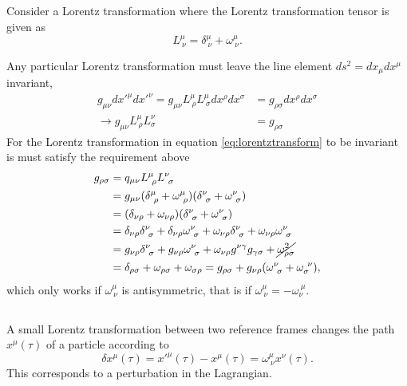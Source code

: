 \documentclass[11pt]{amsart}
\begin{document}
\subsection{}
Consider a Lorentz transformation where the Lorentz transformation tensor is given as
\begin{equation}
\label{eq:lorentztransform}
L^\mu_{\ \nu} = \delta^{\mu}_{\ \nu} + \omega^{\mu}_{\ \nu}.
\end{equation}

Any particular Lorentz transformation must leave the line element $ds^2 = dx_{\mu}dx^{\mu}$ invariant,
\begin{align*}
g_{\mu\nu}dx'^{\mu}dx'^{\nu} = g_{\mu\nu} L^\mu_{\ \rho} L^\mu_{\ \sigma}dx^\rho dx^\sigma 
											&= g_{\rho\sigma}dx^\rho dx^\sigma \\
\rightarrow g_{\mu\nu}L^{\mu}_{\ \rho}L^{\nu}_{\sigma}	&= g_{\rho\sigma}
\end{align*}
For the Lorentz transformation in equation \ref{eq:lorentztransform} to be invariant is must satisfy the requirement above
\begin{align*}
g_{\rho\sigma}  &= q_{\mu\nu}L^{\mu}_{\ \rho}L^{\nu}_{\ \sigma} \\
			&= g_{\mu\nu}(\delta^{\mu}_{\ \rho} + \omega^{\mu}_{\ \rho})(\delta^{\nu}_{\ \sigma} + \omega^{\nu}_{\ \sigma}) \\
			&= (\delta_{\nu\rho} + \omega_{\nu\rho})(\delta^{\nu}_{\ \sigma} + \omega^{\nu}_{\ \sigma}) \\
			&= \delta_{\nu\rho}\delta^{\nu}_{\ \sigma} + \delta_{\nu\rho}\omega^{\nu}_{\ \sigma} + \omega_{\nu\rho}\delta^{\nu}_{\ \sigma} + \omega_{\nu\rho}\omega^{\nu}_{\ \sigma} \\
			&= g_{\nu\rho}\delta^{\nu}_{\ \sigma} + g_{\nu\rho}\omega^{\nu}_{\ \sigma} + \omega_{\nu\rho}g^{\nu\gamma} g_{\gamma\sigma} + \cancel{\omega^2_{\rho\sigma}} \\
			& = \delta_{\rho\sigma} + \omega_{\rho\sigma} + \omega_{\sigma\rho} = g_{\rho\sigma} + g_{\nu\rho}(\omega^{\nu}_{\ \sigma} + \omega_{\sigma}^{\ \nu}),
\end{align*}
which only works if $\omega^{\mu}_{\ \nu}$ is antisymmetric, that is if $\omega^{\mu}_{\ \nu} = -\omega_{\nu}^{\ \mu}$.

\subsection{}
A small Lorentz transformation between two reference frames changes the path $x^\mu(\tau)$ of a particle according to
\begin{equation}
\label{eq:pathperturbation}
\delta x^\mu(\tau) = x'^\mu(\tau) - x^\mu(\tau) = \omega^\mu_{\ \nu}x^\nu(\tau).
\end{equation}
This corresponds to a perturbation in the Lagrangian.
\end{document}
